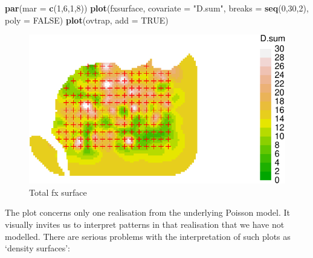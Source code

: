 \documentclass[
]{book}
\newenvironment{Shaded}{\begin{snugshade}}{\end{snugshade}}
\newcommand{\AttributeTok}[1]{\textcolor[rgb]{0.13,0.29,0.53}{#1}}
\newcommand{\ConstantTok}[1]{\textcolor[rgb]{0.56,0.35,0.01}{#1}}
\newcommand{\DecValTok}[1]{\textcolor[rgb]{0.00,0.00,0.81}{#1}}
\newcommand{\FunctionTok}[1]{\textcolor[rgb]{0.13,0.29,0.53}{\textbf{#1}}}
\newcommand{\NormalTok}[1]{#1}
\newcommand{\OtherTok}[1]{\textcolor[rgb]{0.56,0.35,0.01}{#1}}
\newcommand{\SpecialCharTok}[1]{\textcolor[rgb]{0.81,0.36,0.00}{\textbf{#1}}}
\newcommand{\StringTok}[1]{\textcolor[rgb]{0.31,0.60,0.02}{#1}}
\begin{document}
\begin{Shaded}
\end{Shaded}

\begin{Shaded}
\begin{Highlighting}[]
\FunctionTok{par}\NormalTok{(}\AttributeTok{mar =} \FunctionTok{c}\NormalTok{(}\DecValTok{1}\NormalTok{,}\DecValTok{6}\NormalTok{,}\DecValTok{1}\NormalTok{,}\DecValTok{8}\NormalTok{))}
\FunctionTok{plot}\NormalTok{(fxsurface, }\AttributeTok{covariate =} \StringTok{"D.sum"}\NormalTok{, }\AttributeTok{breaks =} \FunctionTok{seq}\NormalTok{(}\DecValTok{0}\NormalTok{,}\DecValTok{30}\NormalTok{,}\DecValTok{2}\NormalTok{), }
     \AttributeTok{poly =} \ConstantTok{FALSE}\NormalTok{)}
\FunctionTok{plot}\NormalTok{(ovtrap, }\AttributeTok{add =} \ConstantTok{TRUE}\NormalTok{)}
\end{Highlighting}
\end{Shaded}

\begin{figure}
\includegraphics[width=0.95\linewidth]{SECRbook_files/figure-latex/OVfxsurfaceplt-1} \caption{Total fx surface}\label{fig:OVfxsurfaceplt}
\end{figure}

The plot concerns only one realisation from the underlying Poisson model. It visually invites us to interpret patterns in that realisation that we have not modelled. There are serious problems with the interpretation of such plots as `density surfaces':
\end{document}
